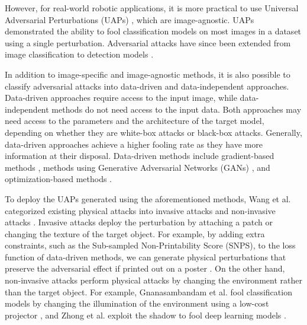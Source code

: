 However, for real-world robotic applications, it is more practical to use Universal Adversarial Perturbations (UAPs) \cite{moosavi2017universal, li2021universal, wu2023adversariald}, which are image-agnostic. UAPs demonstrated the ability to fool classification models on most images in a dataset using a single perturbation. Adversarial attacks have since been extended from image classification to detection models \cite{gurbaxani2018traits, han2023detection}.

In addition to image-specific and image-agnostic methods, it is also possible to classify adversarial attacks into data-driven and data-independent approaches.  Data-driven approaches require access to the input image, while data-independent methods do not need access to the input data. Both approaches may need access to the parameters and the architecture of the target model, depending on whether they are white-box attacks or black-box attacks.  Generally, data-driven approaches achieve a higher fooling rate as they have more information at their disposal. Data-driven methods include gradient-based methods \cite{chow2020adversarial,li2021universal, xie2017adversarial, wu2023adversarial}, methods using Generative Adversarial Networks (GANs) \cite{hashemi2020transferable,Wei2019}, and optimization-based methods \cite{carlini2017towards,liao2021transferable}. 

To deploy the UAPs generated using the aforementioned methods, Wang et al. categorized existing physical attacks into invasive attacks and
non-invasive attacks \cite{wang2022survey}. Invasive attacks deploy the perturbation by attaching a patch \cite{lee2019physical, xu2020adversarial, hu2021naturalistic, thys2019fooling} or changing the texture \cite{wang2021dual, wang2022fca} of the target object. For example, by adding extra constraints, such as the Sub-sampled Non-Printability Score (SNPS), to the loss function of data-driven methods, we can generate physical perturbations that preserve the adversarial effect if printed out on a poster \cite{lee2019physical}. On the other hand, non-invasive attacks perform physical attacks by changing the environment rather than the target object. For example, Gnanasambandam et al. fool classification models by changing the illumination of the environment using a low-cost projector \cite{gnanasambandam2021optical}, and Zhong et al. exploit the shadow to fool deep learning models \cite{zhong2022shadows}.


